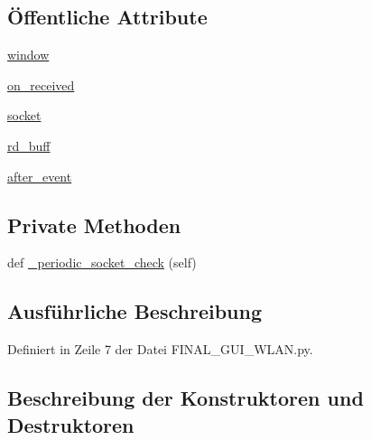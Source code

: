 \subsection*{Öffentliche Attribute}
\begin{DoxyCompactItemize}
\item 
\hyperlink{class_f_i_n_a_l___g_u_i___w_l_a_n_1_1_arduino_a731b3fc58c501b945f1df4d2e8120112}{window}
\item 
\hyperlink{class_f_i_n_a_l___g_u_i___w_l_a_n_1_1_arduino_aecdaccc57653078abe4ffe967cba361e}{on\+\_\+received}
\item 
\hyperlink{class_f_i_n_a_l___g_u_i___w_l_a_n_1_1_arduino_a0728cfa43c874b9a4b8389f4b3215df0}{socket}
\item 
\hyperlink{class_f_i_n_a_l___g_u_i___w_l_a_n_1_1_arduino_a220d4f39773ac5352c7ce4cd4bb89b7d}{rd\+\_\+buff}
\item 
\hyperlink{class_f_i_n_a_l___g_u_i___w_l_a_n_1_1_arduino_a7858221e882d55f393ce792d56115341}{after\+\_\+event}
\end{DoxyCompactItemize}
\subsection*{Private Methoden}
\begin{DoxyCompactItemize}
\item 
def \hyperlink{class_f_i_n_a_l___g_u_i___w_l_a_n_1_1_arduino_a870ded4eb313dea386ae38c6c6267bbf}{\+\_\+periodic\+\_\+socket\+\_\+check} (self)
\end{DoxyCompactItemize}


\subsection{Ausführliche Beschreibung}


Definiert in Zeile 7 der Datei F\+I\+N\+A\+L\+\_\+\+G\+U\+I\+\_\+\+W\+L\+A\+N.\+py.



\subsection{Beschreibung der Konstruktoren und Destruktoren}
\mbox{\label{class_f_i_n_a_l___g_u_i___w_l_a_n_1_1_arduino_ac826ff80647459671ac4367c0c11b7b1}} 
